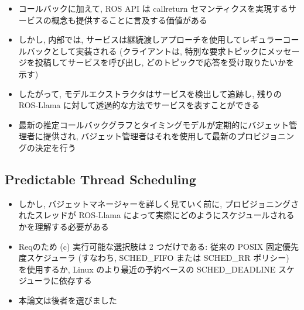 \begin{frame}{}
    \begin{itemize}
        \item コールバックに加えて, ROS API は callreturn セマンティクスを実現するサービスの概念も提供することに言及する価値がある
        \item しかし, 内部では, サービスは継続渡しアプローチを使用してレギュラーコールバックとして実装される (クライアントは, 特別な要求トピックにメッセージを投稿してサービスを呼び出し, どのトピックで応答を受け取りたいかを示す)
        \item したがって, モデルエクストラクタはサービスを検出して追跡し, 残りの ROS-Llama に対して透過的な方法でサービスを表すことができる
    \end{itemize}
\end{frame}

\begin{frame}{}
    \begin{itemize}
        \item 最新の推定コールバックグラフとタイミングモデルが定期的にバジェット管理者に提供され, バジェット管理者はそれを使用して最新のプロビジョニングの決定を行う
    \end{itemize}
\end{frame}


\subsection{Predictable Thread Scheduling}
\label{ssec: predictable thread scheduling}

\begin{frame}{}
    \begin{itemize}
        \item しかし, バジェットマネージャーを詳しく見ていく前に, プロビジョニングされたスレッドが ROS-Llama によって実際にどのようにスケジュールされるかを理解する必要がある
        \item Reqのため (c) 実行可能な選択肢は 2 つだけである: 従来の POSIX 固定優先度スケジューラ (すなわち, SCHED\_FIFO または SCHED\_RR ポリシー) を使用するか, Linux のより最近の予約ベースの SCHED\_DEADLINE スケジューラに依存する
        \item 本論文は後者を選びました
    \end{itemize}
\end{frame}

